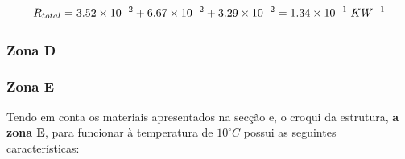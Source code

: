 \documentclass[12pt, a4paper]{article}
\begin{document}
\begin{equation}
	R_{total} =
			3.52 \times 10^{-2} + 6.67 \times 10^{-2} + 3.29 \times 10^{-2} = 1.34 \times 10^{-1} \hspace{1mm} KW^{-1}
	\label{eq:zona_c_total}
\end{equation}


\subsubsection{Zona D}\label{ssub:Zona D}



\subsubsection{Zona E}\label{ssub:Zona E}

Tendo em conta os materiais apresentados na secção e, o croqui da estrutura, \textbf{a zona E}, para funcionar
à temperatura de $ 10^\circ C $ possui as seguintes características:
\end{document}
